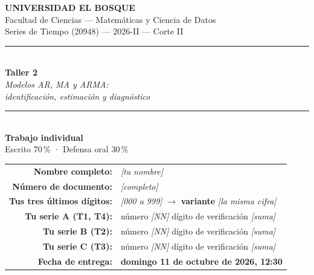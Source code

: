 \documentclass[11pt,a4paper,oneside]{article}
\newcommand{\marcador}[1]{\textcolor{grismarcador}{\textit{[#1]}}}
\begin{document}
\thispagestyle{empty}
\begin{center}

{\large\textbf{UNIVERSIDAD EL BOSQUE}}\\[0.15cm]
{\normalsize Facultad de Ciencias --- Matemáticas y Ciencia de Datos}\\[0.1cm]
{\normalsize Series de Tiempo (20948) --- 2026-II --- Corte II}\\[0.9cm]

\rule{\textwidth}{1.2pt}\\[0.25cm]
{\LARGE\textbf{Taller 2}}\\[0.15cm]
{\large\textit{Modelos AR, MA y ARMA:\\ identificación, estimación y diagnóstico}}\\[0.25cm]
\rule{\textwidth}{1.2pt}\\[0.9cm]

{\large\textbf{Trabajo individual}}\\[0.15cm]
{\normalsize Escrito 70\,\% \quad · \quad Defensa oral 30\,\%}\\[1.0cm]

\end{center}

\begin{tabular}{rl}
\textbf{Nombre completo:}          & \marcador{tu nombre} \\[0.25cm]
\textbf{Número de documento:}      & \marcador{completo} \\[0.25cm]
\textbf{Tus tres últimos dígitos:} & \marcador{000 a 999} \quad $\rightarrow$ \quad
                                     \textbf{variante} \marcador{la misma cifra} \\[0.25cm]
\textbf{Tu serie A (T1, T4):}      & número \marcador{NN} \quad dígito de verificación \marcador{suma} \\[0.25cm]
\textbf{Tu serie B (T2):}          & número \marcador{NN} \quad dígito de verificación \marcador{suma} \\[0.25cm]
\textbf{Tu serie C (T3):}          & número \marcador{NN} \quad dígito de verificación \marcador{suma} \\[0.25cm]
\textbf{Fecha de entrega:}         & \textbf{domingo 11 de octubre de 2026, 12:30} \\
\end{tabular}
\end{document}
